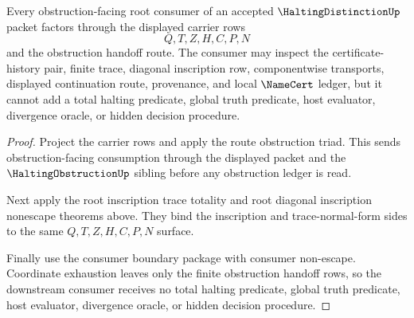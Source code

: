\begin{theorem}
\label{thm:halting-distinction-root-consumer-obstruction-row-exhaustion}
Every obstruction-facing root consumer of an accepted $\HaltingDistinctionUp$ packet factors through the displayed carrier rows
$$
Q,T,Z,H,C,P,N
$$
and the obstruction handoff route. The consumer may inspect the certificate-history pair, finite trace, diagonal inscription row, componentwise transports, displayed continuation route, provenance, and local $\NameCert$ ledger, but it cannot add a total halting predicate, global truth predicate, host evaluator, divergence oracle, or hidden decision procedure.
\end{theorem}
\begin{proof}
Project the carrier rows and apply the route obstruction triad. This sends obstruction-facing consumption through the displayed packet and the $\HaltingObstructionUp$ sibling before any obstruction ledger is read.

Next apply the root inscription trace totality and root diagonal inscription nonescape theorems above. They bind the inscription and trace-normal-form sides to the same $Q,T,Z,H,C,P,N$ surface.

Finally use the consumer boundary package with consumer non-escape. Coordinate exhaustion leaves only the finite obstruction handoff rows, so the downstream consumer receives no total halting predicate, global truth predicate, host evaluator, divergence oracle, or hidden decision procedure.
\end{proof}
